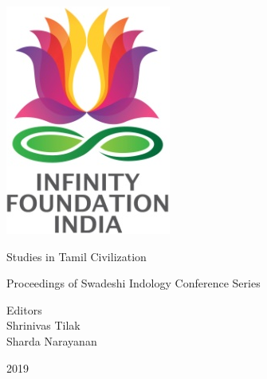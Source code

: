 \thispagestyle{empty}

\includegraphics{images/logo.png}

Studies in Tamil Civilization


Proceedings of Swadeshi Indology Conference Series

Editors\\Shrinivas Tilak\\Sharda Narayanan


2019

